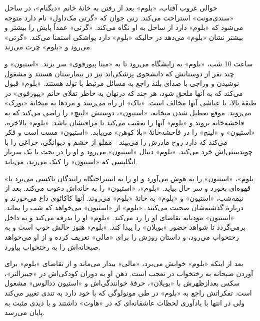 \documentclass[12pt]{book}
\newcommand{\noun}[1]{«{#1}»}
\begin{document}
    حوالی غروب آفتاب، \noun{بلوم} بعد از رفتن به خانۀ خانم \noun{دیگنام}، در ساحل \noun{سندی‌مونت} استراحت می‌کند. زنی جوان که \noun{گرتی مک‌داول} نام دارد متوجه می‌شود که \noun{بلوم} دارد از ساحل به او نگاه می‌کند. \noun{گرتی} عمداً پایش را بیشتر و بیشتر نشان \noun{بلوم} می‌دهد در حالیکه \noun{بلوم} دارد یواشکی استمنا می‌کند. \noun{گرتی} می‌رود و \noun{بلوم} چرت می‌زند.

    ساعت 10 شب، \noun{بلوم} به زایشگاه می‌رود تا به \noun{مینا پیورفوی} سر بزند. \noun{استیون} و چند نفر از دوستانش که دانشجوی پزشکی‌اند نیز در بیمارستان هستند و مشغول نوشیدن و وراجی با صدای بلند راجع به مسائل مرتبط با تولد هستند. \noun{بلوم} قبول می‌کند که به آنها ملحق شود، هر چند که درنهان به خاطر تقلای خانم \noun{پیورفوی} در طبقۀ بالا، با عیاشی آنها مخالف است. \noun{باک} از راه می‌رسد و مردها به میخانۀ \noun{بورک} می‌روند. موقع تعطیل شدن میخانه، \noun{استیون}، دوستش \noun{لینچ} را راضی می‌کند که به فاحشه‌خانه بروند و \noun{بلوم} آنها را تعقیب می‌کند تا مراقبشان باشد.
    \noun{بلوم} بالاخره، \noun{استیون} و \noun{لینچ} را در فاحشه‌خانۀ \noun{بلا کوهن} می‌یابد. \noun{استیون} مست است و فکر می‌کند که دارد روح مادرش را می‌بیند - مملو از خشم و دیوانگی، چراغی را با چوبدستی‌اش خرد می‌کند. \noun{بلوم} دنبال \noun{استیون} می‌رود و او را در بحث با یک سرباز انگلیسی که \noun{استیون} را کتک می‌زند، می‌یابد.

    \noun{بلوم}، \noun{استیون} را به هوش می‌آورد و او را به استراحتگاه رانندگان تاکسی می‌برد تا قهوه‌ای بخورد و سر حال بیاید. \noun{بلوم}، \noun{استیون} را به خانه‌اش دعوت می‌کند.
    بعد از نیمه‌شب، \noun{استیون} و \noun{بلوم} به خانۀ \noun{بلوم} می‌روند. آنها کاکائوی داغ می‌خورند و دربارۀ گذشته‌شان صحبت می‌کنند. \noun{بلوم} از \noun{استیون} می‌خواهد که شب را بماند. \noun{استیون} مودبانه تقاضای او را رد می‌کند. \noun{بلوم} او را بدرقه می‌کند و به داخل برمی‌گردد تا شواهد حضور \noun{بویلان} را پیدا کند. \noun{بلوم} هنوز حالش خوب است و به رختخواب می‌رود، و داستان روزش را برای \noun{مالی} تعریف کرده و از او می‌خواهد صبحانه‌اش را به رختخواب بیاورد.

    بعد از اینکه \noun{بلوم} خوابش می‌برد، \noun{مالی} بیدار می‌ماند و از تقاضای \noun{بلوم} برای آوردن صبحانه به رختخواب در تعجب است. ذهن او به دوران کودکی‌اش در \noun{جیبرالتر}، سکس بعدازظهرش با \noun{بویلان}، حرفۀ خوانندگی‌اش و \noun{استیون ددالوس} مشغول است. تفکراتش راجع به \noun{بلوم} در طی مونولوگی که با خود دارد به تندی تغییر می‌کند ولی در انتها با یادآوری لحظات عاشقانه‌ای که در \noun{هاوث} داشتند و با دیدی مثبت به پایان می‌رسد.
\end{document}
